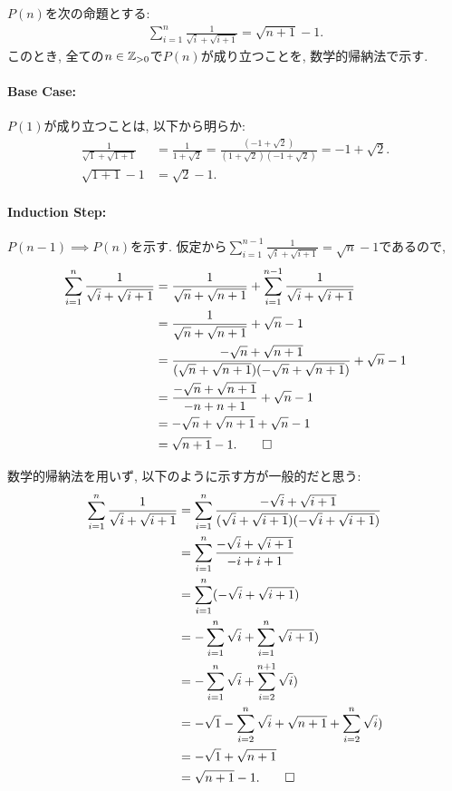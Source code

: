 \begin{proof*}
  $P(n)$を次の命題とする:
  \begin{align*}
    \sum_{i=1}^n \frac{1}{\sqrt{i}+\sqrt{i+1}}=\sqrt{n+1}-1
    .
  \end{align*}
  このとき,
  全ての$n\in\mathbb{Z}_{>0}$で$P(n)$が成り立つことを,
  数学的帰納法で示す.

  \paragraph{Base Case:}
  $P(1)$が成り立つことは, 以下から明らか:
  \begin{align*}
    \frac{1}{\sqrt{1}+\sqrt{1+1}}&=\frac{1}{1+\sqrt{2}}=
    \frac{(-1+\sqrt{2})}{(1+\sqrt{2})(-1+\sqrt{2})}=
    -1+\sqrt{2}.\\
    \sqrt{1+1}-1&=\sqrt{2}-1.
    \end{align*}

  \paragraph{Induction Step:}
  $P(n-1)\implies P(n)$を示す.
  仮定から$\sum_{i=1}^{n-1}\frac{1}{\sqrt{i}+\sqrt{i+1}}=\sqrt{n}-1$であるので,
  \begin{align*}
    \sum_{i=1}^n \frac{1}{\sqrt{i}+\sqrt{i+1}}
    &= \frac{1}{\sqrt{n}+\sqrt{n+1}}+\sum_{i=1}^{n-1} \frac{1}{\sqrt{i}+\sqrt{i+1}}\\
    &= \frac{1}{\sqrt{n}+\sqrt{n+1}}+\sqrt{n}-1\\
    &= \frac{-\sqrt{n}+\sqrt{n+1}}{(\sqrt{n}+\sqrt{n+1})(-\sqrt{n}+\sqrt{n+1})}+\sqrt{n}-1\\
    &= \frac{-\sqrt{n}+\sqrt{n+1}}{-n+n+1}+\sqrt{n}-1\\
    &= -\sqrt{n}+\sqrt{n+1}+\sqrt{n}-1\\
    &=\sqrt{n+1}-1
    .\qedhere
  \end{align*}
\end{proof*}
\begin{rem}
  数学的帰納法を用いず, 以下のように示す方が一般的だと思う:
  \begin{align*}
    \sum_{i=1}^n \frac{1}{\sqrt{i}+\sqrt{i+1}}
    &=\sum_{i=1}^n \frac{-\sqrt{i}+\sqrt{i+1}}{(\sqrt{i}+\sqrt{i+1})(-\sqrt{i}+\sqrt{i+1})}\\
    &=\sum_{i=1}^n \frac{-\sqrt{i}+\sqrt{i+1}}{-i+i+1}\\
    &=\sum_{i=1}^n (-\sqrt{i}+\sqrt{i+1})\\
    &=-\sum_{i=1}^n\sqrt{i}+\sum_{i=1}^n\sqrt{i+1})\\
    &=-\sum_{i=1}^n\sqrt{i}+\sum_{i=2}^{n+1}\sqrt{i})\\
    &=-\sqrt{1}-\sum_{i=2}^n\sqrt{i}+\sqrt{n+1}+\sum_{i=2}^{n}\sqrt{i})\\
    &=-\sqrt{1}+\sqrt{n+1}\\
    &=\sqrt{n+1}-1
    .\qedhere
  \end{align*}
\end{rem}

